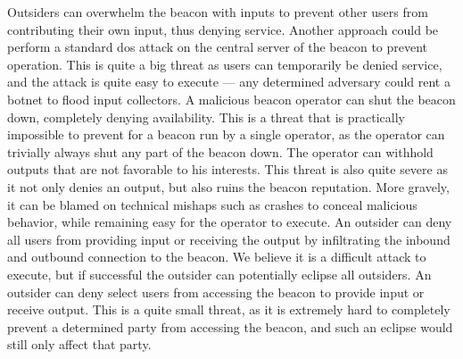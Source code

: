  Outsiders can overwhelm the beacon with inputs to prevent other users from contributing their own input, thus denying service. Another approach could be perform a standard \gls{dos} attack on the central server of the beacon to prevent operation. This is quite a big threat as users can temporarily be denied service, and the attack is quite easy to execute --- any determined adversary could rent a botnet to flood input collectors.    %
 A malicious beacon operator can shut the beacon down, completely denying availability. This is a threat that is practically impossible to prevent for a beacon run by a single operator, as the operator can trivially always shut any part of the beacon down.
 The operator can withhold outputs that are not favorable to his interests. This threat is also quite severe as it not only denies an output, but also ruins the beacon reputation. More gravely, it can be blamed on technical mishaps such as crashes to conceal malicious behavior, while remaining easy for the operator to execute.
 An outsider can deny all users from providing input or receiving the output by infiltrating the inbound and outbound connection to the beacon. We believe it is a difficult attack to execute, but if successful the outsider can potentially eclipse all outsiders.
 An outsider can deny select users from accessing the beacon to provide input or receive output. This is a quite small threat, as it is extremely hard to completely prevent a determined party from accessing the beacon, and such an eclipse would still only affect that party.
